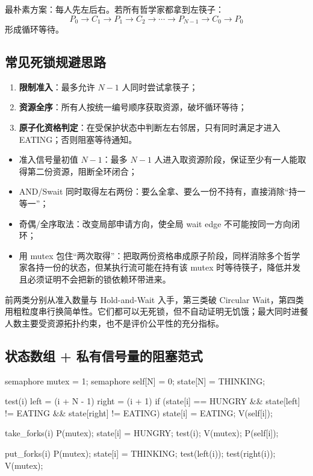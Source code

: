 \documentclass[11pt,a4paper]{ctexart}
\newcommand{\kw}[1]{\textbf{#1}}
\begin{document}
最朴素方案：每人先左后右。若所有哲学家都拿到左筷子：
\[
P_0\to C_1\to P_1\to C_2\to\cdots\to P_{N-1}\to C_0\to P_0
\]
形成循环等待。

\subsection{常见死锁规避思路}

\begin{enumerate}
\item \kw{限制准入}：最多允许 $N-1$ 人同时尝试拿筷子；
\item \kw{资源全序}：所有人按统一编号顺序获取资源，破坏循环等待；
\item \kw{原子化资格判定}：在受保护状态中判断左右邻居，只有同时满足才进入 EATING；否则阻塞等待通知。
\end{enumerate}

\begin{method}[四类经典解法究竟破坏了哪个中间状态]
\begin{itemize}
\item 准入信号量初值 $N-1$：最多 $N-1$ 人进入取资源阶段，保证至少有一人能取得第二份资源，阻断全环闭合；
\item AND/Swait 同时取得左右两份：要么全拿、要么一份不持有，直接消除“持一等一”；
\item 奇偶/全序取法：改变局部申请方向，使全局 wait edge 不可能按同一方向闭环；
\item 用 mutex 包住“两次取得”：把取两份资格串成原子阶段，同样消除多个哲学家各持一份的状态，但某执行流可能在持有该 mutex 时等待筷子，降低并发且必须证明不会把新的锁依赖环带进来。
\end{itemize}
前两类分别从准入数量与 Hold-and-Wait 入手，第三类破 Circular Wait，第四类用粗粒度串行换简单性。它们都可以无死锁，但不自动证明无饥饿；最大同时进餐人数主要受资源拓扑约束，也不是评价公平性的充分指标。
\end{method}

\subsection{状态数组 + 私有信号量的阻塞范式}

\begin{codeblock}
semaphore mutex = 1;
semaphore self[N] = {0};
state[N] = {THINKING};

test(i) {
    left  = (i + N - 1) %
    right = (i + 1) %
    if (state[i] == HUNGRY &&
        state[left]  != EATING &&
        state[right] != EATING) {
        state[i] = EATING;
        V(self[i]);
    }
}

take_forks(i) {
    P(mutex);
    state[i] = HUNGRY;
    test(i);
    V(mutex);
    P(self[i]);
}

put_forks(i) {
    P(mutex);
    state[i] = THINKING;
    test(left(i));
    test(right(i));
    V(mutex);
}
\end{codeblock}
\end{document}
